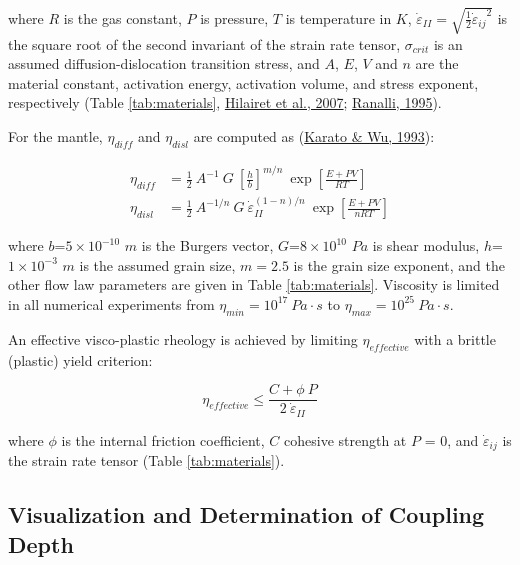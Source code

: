 where \(R\) is the gas constant, \(P\) is pressure, \(T\) is temperature in \(K\), \({\dot{\varepsilon}}_{II} = \sqrt{\frac{1}{2}{{\dot{\varepsilon}}_{ij}}^{2}}\) is the square root of the second invariant of the strain rate tensor, \(\sigma_{crit}\) is an assumed diffusion-dislocation transition stress, and \(A\), \(E\), \(V\) and \(n\) are the material constant, activation energy, activation volume, and stress exponent, respectively (Table \ref{tab:materials}, \protect\hyperlink{ref-hilairet2007}{Hilairet et al., 2007}; \protect\hyperlink{ref-ranalli1995}{Ranalli, 1995}).

For the mantle, \(\eta_{diff}\) and \(\eta_{disl}\) are computed as (\protect\hyperlink{ref-karato1993}{Karato \& Wu, 1993}):

\begin{equation}
  \begin{aligned}
    \eta_{diff} &= \frac{1}{2} \ A^{-1} \ G \ \left[\frac{h}{b}\right]^{m/n} \ \exp\left[\frac{E+PV}{RT}\right] \\
    \eta_{disl} &= \frac{1}{2} \ A^{-1/n} \ G \ \dot{\varepsilon}_{II}^{(1-n)/n} \ \exp\left[\frac{E+PV}{nRT}\right]
  \end{aligned}
  \label{eq:mantle}
\end{equation}

where \(b\)=\(5\times10^{-10}\) \(m\) is the Burgers vector, \(G\)=\(8\times10^{10}\) \(Pa\) is shear modulus, \(h\)=\(1\times10^{-3}\) \(m\) is the assumed grain size, \(m=2.5\) is the grain size exponent, and the other flow law parameters are given in Table \ref{tab:materials}. Viscosity is limited in all numerical experiments from \(\eta_{min} = 10^{17}\ Pa \cdot s\) to \(\eta_{max} = 10^{25}\ Pa \cdot s\).

An effective visco-plastic rheology is achieved by limiting \(\eta_{effective}\) with a brittle (plastic) yield criterion:

\begin{equation}
  \eta_{effective} \leq \frac{C + \phi \ P}{2 \ \dot{\varepsilon}_{II}}
  \label{eq:plastic}
\end{equation}

where \(\phi\) is the internal friction coefficient, \(C\) cohesive strength at \(P\) = 0, and \({\dot{\varepsilon}}_{ij}\) is the strain rate tensor (Table \ref{tab:materials}).

\hypertarget{visualization-and-determination-of-coupling-depth}{%
\subsection{Visualization and Determination of Coupling Depth}\label{visualization-and-determination-of-coupling-depth}}

